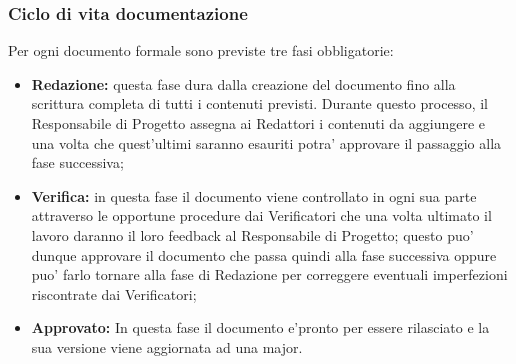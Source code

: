 		\subsubsection{Ciclo di vita documentazione}
			Per ogni documento formale sono previste tre fasi obbligatorie:
			\begin{itemize}
			\item \textbf{Redazione:} questa fase dura dalla creazione del documento fino alla scrittura completa di tutti i contenuti previsti. Durante questo processo, il Responsabile di Progetto assegna ai Redattori i contenuti da aggiungere e una volta che quest'ultimi saranno esauriti potra' approvare il passaggio alla fase successiva;
			\item \textbf{Verifica:} in questa fase il documento viene controllato in ogni sua parte attraverso le opportune procedure dai Verificatori che una volta ultimato il lavoro daranno il loro feedback al Responsabile di Progetto; questo puo' dunque approvare il documento che passa quindi alla fase successiva oppure puo' farlo tornare alla fase di Redazione per correggere eventuali imperfezioni riscontrate dai Verificatori;
			\item \textbf{Approvato:} In questa fase il documento e'pronto per essere rilasciato e la sua versione viene aggiornata ad una major.
			\end{itemize}
